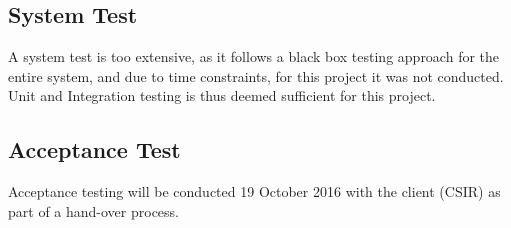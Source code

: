 \subsection{System Test}

A system test is too extensive, as it follows a black box testing approach for the entire system, and due to time constraints, for this project it was not conducted. Unit and Integration testing is thus deemed sufficient for this project. \\

\subsection{Acceptance Test}

Acceptance testing will be conducted 19 October 2016 with the client (CSIR) as part of a hand-over process.